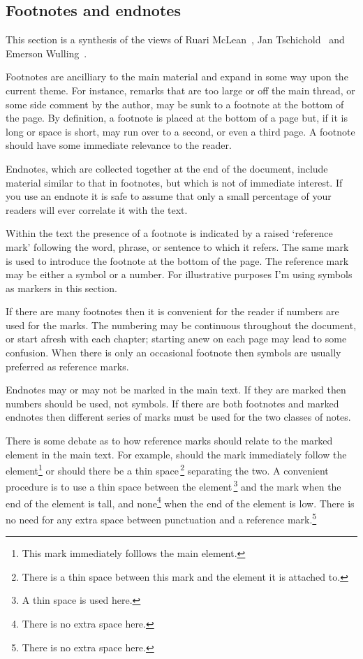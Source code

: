 \documentclass[10pt,letterpaper,extrafontsizes]{memoir}
\begin{document}
\subsection{Footnotes and endnotes}

\renewcommand*{\thefootnote}{\fnsymbol{footnote}}
\let\oldfootnoterule\footnoterule
\renewcommand*{\footnoterule}{}
    This section is a synthesis of the views of Ruari McLean~\autocite{MCLEAN80},
Jan Tschichold~\autocite{TSCHICHOLD91} and 
Emerson Wulling~\autocite{WULLING-FOOTNOTES}.

    Footnotes are ancilliary to the main material and 
expand in some way
upon the current theme. For instance, remarks that are too large or off the
main thread, or some side comment by the author, may be sunk to a footnote 
at the bottom of the page. By definition, a footnote is placed at the 
bottom of a page but, if it is long or space is short, may run over to a 
second, or even a third page. A footnote should have some immediate 
relevance to the reader.

Endnotes, which are collected together at the end of the 
document, include 
material similar to that in footnotes, but which is not of immediate interest.
If you use an endnote it is safe to assume that only a small 
percentage of your readers will ever correlate it with the text.
 
    Within the text the presence of a footnote is indicated by a raised 
`reference mark' following the
word, phrase, or sentence to which it refers. The same mark is used 
to introduce the footnote at the bottom of the page.
The reference mark may be either a 
symbol or a number. For illustrative purposes I'm using symbols
as markers in this section.

   If there are many footnotes then it is convenient for the reader if numbers 
are used for the marks. The numbering may be continuous 
throughout the document,
or start afresh with each chapter; starting anew on each page may lead to
some confusion. When there is only an occasional footnote then symbols 
are usually preferred as reference marks.

    Endnotes may or may not be marked in the main text. 
If they are marked then numbers
should be used, not symbols. If there are both footnotes and marked endnotes 
then different series of marks must be used for the two classes of notes.

    There is some debate as to how reference marks should relate to the 
marked element in the main text. For example, should the mark immediately 
follow the element\footnote{This mark immediately folllows the main element.} 
or should there be a thin space\,\footnote{There is a thin space between this
mark and the element it is attached to.} separating the two. A convenient 
procedure is to use a thin space between the 
element\,\footnote{A thin space is used here.} and the mark when the end of 
the element is tall, and 
none\footnote{There is no extra space here.} when the end of the element is 
low. There is no need for any extra space between punctuation and a reference
mark.\footnote{There is no extra space here.}
\end{document}
